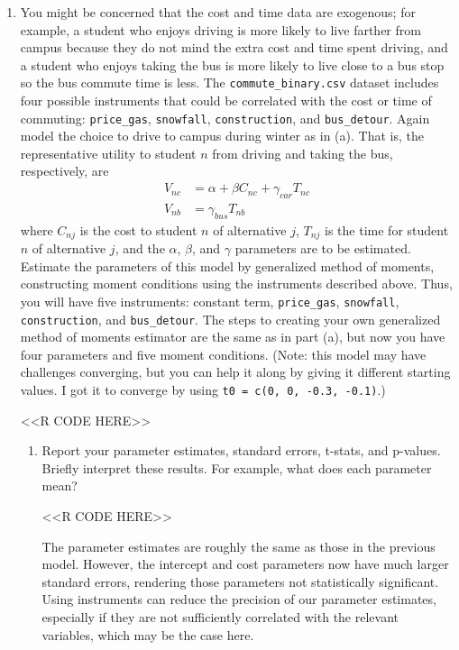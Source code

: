 \documentclass[11pt,letterpaper]{article}
\begin{document}
\begin{enumerate}[label=\alph*., leftmargin=*]
	\item You might be concerned that the cost and time data are exogenous; for example, a student who enjoys driving is more likely to live farther from campus because they do not mind the extra cost and time spent driving, and a student who enjoys taking the bus is more likely to live close to a bus stop so the bus commute time is less. The \texttt{commute\_binary.csv} dataset includes four possible instruments that could be correlated with the cost or time of commuting: \texttt{price\_gas}, \texttt{snowfall}, \texttt{construction}, and \texttt{bus\_detour}. Again model the choice to drive to campus during winter as in (a). That is, the representative utility to student $n$ from driving and taking the bus, respectively, are
	\begin{align*}
		V_{nc} & = \alpha + \beta C_{nc} + \gamma_{car} T_{nc} \\
		V_{nb} & = \gamma_{bus} T_{nb}
	\end{align*}
	where $C_{nj}$ is the cost to student $n$ of alternative $j$, $T_{nj}$ is the time for student $n$ of alternative $j$, and the $\alpha$, $\beta$, and $\gamma$ parameters are to be estimated. Estimate the parameters of this model by generalized method of moments, constructing moment conditions using the instruments described above. Thus, you will have five instruments: constant term, \texttt{price\_gas}, \texttt{snowfall}, \texttt{construction}, and \texttt{bus\_detour}. The steps to creating your own generalized method of moments estimator are the same as in part (a), but now you have four parameters and five moment conditions. (Note: this model may have challenges converging,  but you can help it along by giving it different starting values. I got it to converge by using \texttt{t0 = c(0, 0, -0.3, -0.1)}.)

	<<R CODE HERE>>

	\begin{enumerate}[label=\roman*.]
		\item Report your parameter estimates, standard errors, t-stats, and p-values. Briefly interpret these results. For example, what does each parameter mean?

		<<R CODE HERE>>

		The parameter estimates are roughly the same as those in the previous model. However, the intercept and cost parameters now have much larger standard errors, rendering those parameters not statistically significant. Using instruments can reduce the precision of our parameter estimates, especially if they are not sufficiently correlated with the relevant variables, which may be the case here.


\end{enumerate}
\end{enumerate}
\end{document}

